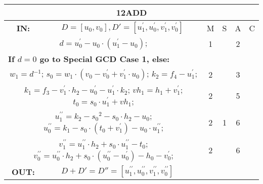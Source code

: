 \begin{tabular}{|c|cr|c|c|c|c|}
\hline
\multicolumn{7}{|c|}{\bf{12ADD}} \TS \\
\hline
\bf{IN:} &\multicolumn{2}{|c|}{$D = [u_{0},v_{0}], D' = [u^{\prime}_{1},u^{\prime}_{0},v^{\prime}_{1},v^{\prime}_{0}]$}
\TS & M & \hspace{1pt}S\hspace{1pt} & A & \hspace{1pt}C\hspace{1pt} \\
\hline
\multicolumn{3}{|R{340pt}|}{ 
$d=u^{\prime}_{0}-u_{0} \cdot (u^{\prime}_{1}-u_{0})$;\hspace{4pt}
} & 1 &  & 2 & \\
\multicolumn{3}{|l|}{ 
 \bf{If $d = 0$ go to Special GCD Case 1, else:} } &  &  &  & \\
\multicolumn{3}{|R{340pt}|}{ 
$w_{1}=d{}^{-1}$;\hspace{4pt}
$s_{0}=w_{1} \cdot (v_{0}-v^{\prime}_{0}+v^{\prime}_{1} \cdot u_{0})$;\hspace{4pt}
$k_{2}=f_{4}-u^{\prime}_{1}$;\hspace{4pt}
} & 2 &  & 3 & \\
\multicolumn{3}{|R{340pt}|}{ 
$k_{1}=f_{3}-v^{\prime}_{1} \cdot h_{2}-u^{\prime}_{0}-u^{\prime}_{1} \cdot k_{2}$;\hspace{4pt}
$vh_{1}=h_{1}+v^{\prime}_{1}$;\hspace{4pt}
$t_{0}=s_{0} \cdot u^{\prime}_{1}+vh_{1}$;\hspace{4pt}
} & 2 &  & 5 & \\
\multicolumn{3}{|R{340pt}|}{ 
$u^{\prime\prime}_{1}=k_{2}-s_{0}{}^{2}-s_{0} \cdot h_{2}-u_{0}$;\hspace{4pt}
$u^{\prime\prime}_{0}=k_{1}-s_{0} \cdot (t_{0}+v^{\prime}_{1})-u_{0} \cdot u^{\prime\prime}_{1}$;\hspace{4pt}
} & 2 & 1 & 6 & \\
\multicolumn{3}{|R{340pt}|}{ 
$v^{\prime\prime}_{1}=u^{\prime\prime}_{1} \cdot h_{2}+s_{0} \cdot u^{\prime\prime}_{1}-t_{0}$;\hspace{4pt}
$v^{\prime\prime}_{0}=u^{\prime\prime}_{0} \cdot h_{2}+s_{0} \cdot (u^{\prime\prime}_{0}-u^{\prime}_{0})-h_{0}-v^{\prime}_{0}$;\hspace{4pt}
} & 2 &  & 6 & \\
\hline
\bf{OUT:} & \hspace*{65pt} $D + D' = D'' = [u^{\prime\prime}_{1},u^{\prime\prime}_{0},v^{\prime\prime}_{1},v^{\prime\prime}_{0}]$

\end{tabular}
